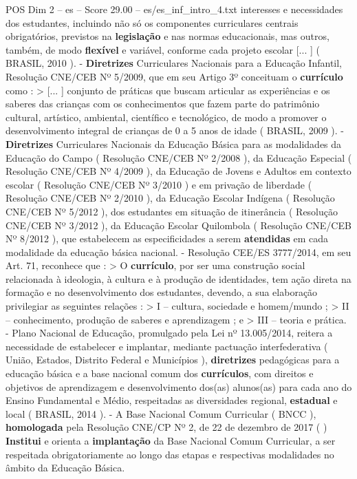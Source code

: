 \begin{textsample}{POS Dim 2 – es – Score 29.00 – es/es\_inf\_intro\_4.txt}
interesses e necessidades dos estudantes, incluindo não só os componentes curriculares centrais obrigatórios, previstos na \textbf{legislação} e nas normas educacionais, mas outros, também, de modo \textbf{flexível} e variável, conforme cada projeto escolar [... ] ( BRASIL, 2010 ). - \textbf{Diretrizes} Curriculares Nacionais para a Educação Infantil, Resolução CNE/CEB Nº 5/2009, que em seu Artigo 3º conceituam o \textbf{currículo} como : > [... ] conjunto de práticas que buscam articular as experiências e os saberes das crianças com os conhecimentos que fazem parte do patrimônio cultural, artístico, ambiental, científico e tecnológico, de modo a promover o desenvolvimento integral de crianças de 0 a 5 anos de idade ( BRASIL, 2009 ). - \textbf{Diretrizes} Curriculares Nacionais da Educação Básica para as modalidades da Educação do Campo ( Resolução CNE/CEB Nº 2/2008 ), da Educação Especial ( Resolução CNE/CEB Nº 4/2009 ), da Educação de Jovens e Adultos em contexto escolar ( Resolução CNE/CEB Nº 3/2010 ) e em privação de liberdade ( Resolução CNE/CEB Nº 2/2010 ), da Educação Escolar Indígena ( Resolução CNE/CEB Nº 5/2012 ), dos estudantes em situação de itinerância ( Resolução CNE/CEB Nº 3/2012 ), da Educação Escolar Quilombola ( Resolução CNE/CEB Nº 8/2012 ), que estabelecem as especificidades a serem \textbf{atendidas} em cada modalidade da educação básica nacional. - Resolução CEE/ES 3777/2014, em seu Art. 71, reconhece que : > O \textbf{currículo}, por ser uma construção social relacionada à ideologia, à cultura e à produção de identidades, tem ação direta na formação e no desenvolvimento dos estudantes, devendo, a sua elaboração privilegiar as seguintes relações : > I – cultura, sociedade e homem/mundo ; > II – conhecimento, produção de saberes e aprendizagem ; e > III – teoria e prática. - Plano Nacional de Educação, promulgado pela Lei nº 13.005/2014, reitera a necessidade de estabelecer e implantar, mediante pactuação interfederativa ( União, Estados, Distrito Federal e Municípios ), \textbf{diretrizes} pedagógicas para a educação básica e a base nacional comum dos \textbf{currículos}, com direitos e objetivos de aprendizagem e desenvolvimento dos(as) alunos(as) para cada ano do Ensino Fundamental e Médio, respeitadas as diversidades regional, \textbf{estadual} e local ( BRASIL, 2014 ). - A Base Nacional Comum Curricular ( BNCC ), \textbf{homologada} pela Resolução CNE/CP Nº 2, de 22 de dezembro de 2017 ( ) \textbf{Institui} e orienta a \textbf{implantação} da Base Nacional Comum Curricular, a ser respeitada obrigatoriamente ao longo das etapas e respectivas modalidades no âmbito da Educação Básica.

\end{textsample}
